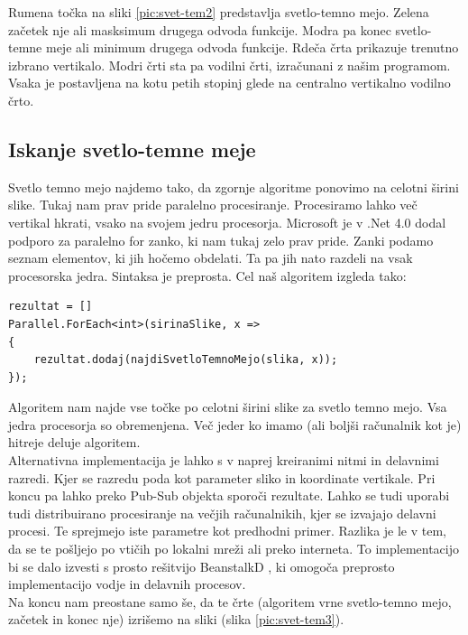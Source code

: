 \documentclass[oneside, a4paper, 12pt]{book}
\begin{document}
Rumena točka na sliki \ref{pic:svet-tem2} predstavlja svetlo-temno mejo. Zelena začetek nje ali masksimum drugega odvoda funkcije. Modra pa konec svetlo-temne meje ali minimum drugega odvoda funkcije. Rdeča črta prikazuje trenutno izbrano vertikalo. Modri črti sta pa vodilni črti, izračunani z našim programom. Vsaka je postavljena na kotu petih stopinj glede na centralno vertikalno vodilno črto. 


\subsection{Iskanje svetlo-temne meje}
\label{ch:iskanj-sv-t-m}
Svetlo temno mejo najdemo tako, da zgornje algoritme ponovimo na celotni širini slike. Tukaj nam prav pride paralelno procesiranje. Procesiramo lahko več vertikal hkrati, vsako na svojem jedru procesorja. Microsoft je v .Net 4.0 dodal podporo za paralelno for zanko, ki nam tukaj zelo prav pride. Zanki podamo seznam elementov, ki jih hočemo obdelati. Ta pa jih nato razdeli na vsak procesorska jedra. Sintaksa je preprosta. Cel naš algoritem izgleda tako:

\begin{verbatim}
rezultat = []
Parallel.ForEach<int>(sirinaSlike, x =>
{
    rezultat.dodaj(najdiSvetloTemnoMejo(slika, x));
});
\end{verbatim}


Algoritem nam najde vse točke po celotni širini slike za svetlo temno mejo. Vsa jedra procesorja so obremenjena. Več jeder ko imamo (ali boljši računalnik kot je) hitreje deluje algoritem. \\
Alternativna implementacija je lahko s v naprej kreiranimi nitmi in delavnimi razredi. Kjer se razredu poda kot parameter sliko in koordinate vertikale. Pri koncu pa lahko preko Pub-Sub objekta sporoči rezultate. Lahko se tudi uporabi tudi distribuirano procesiranje na večjih računalnikih, kjer se izvajajo delavni procesi. Te sprejmejo iste parametre kot predhodni primer. Razlika je le v tem, da se te pošljejo po vtičih po lokalni mreži ali preko interneta. To implementacijo bi se dalo izvesti s prosto rešitvijo BeanstalkD \cite{beanstalkd}, ki omogoča preprosto implementacijo vodje in delavnih procesov.\\
Na koncu nam preostane samo še, da te črte (algoritem vrne svetlo-temno mejo, začetek in konec nje) izrišemo na sliki (slika \ref{pic:svet-tem3}). 
\end{document}
